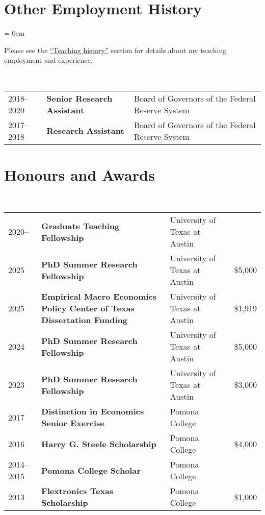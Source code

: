 \documentclass[a4paper, 10pt]{article}
\begin{document}
  \section{Other Employment History}
  \begin{compactitem}\parskip = 0cm
    \item Please see the {\hypersetup{linkcolor = black}\hyperref[sec:teaching_history]{``Teaching history''}} section for details about my teaching employment and experience.
  \end{compactitem}
  \vspace*{0.70em}
  ~\begin{tabular}{lll}
    2018--2020 & \textbf{Senior Research Assistant} & Board of Governors of the Federal Reserve System\\
    2017--2018 & \textbf{Research Assistant} & Board of Governors of the Federal Reserve System
  \end{tabular}
  \vspace*{0.25em}

  \section{Honours and Awards}
  ~\begin{tabular}{p{1.6cm} p{6.2cm} p{4.2cm} p{0.95cm}}
    2020-- & \textbf{Graduate Teaching Fellowship} & University of Texas at Austin &\\
    2025 & \textbf{PhD Summer Research Fellowship} & University of Texas at Austin & \$5,000\\
    2025 & \textbf{Empirical Macro Economics Policy \newline Center of Texas Dissertation Funding} & University of Texas at Austin & \$1,919\\
    2024 & \textbf{PhD Summer Research Fellowship} & University of Texas at Austin & \$5,000\\
    2023 & \textbf{PhD Summer Research Fellowship} & University of Texas at Austin & \$3,000\\
    2017 & \textbf{Distinction in Economics Senior Exercise} & Pomona College &\\
    2016 & \textbf{Harry G. Steele Scholarship} & Pomona College & \$4,000\\
    2014--2015 & \textbf{Pomona College Scholar} & Pomona College &\\
    2013 & \textbf{Flextronics Texas Scholarship} & Pomona College & \$1,000
  \end{tabular}
  \vspace*{0.25em}
\end{document}
